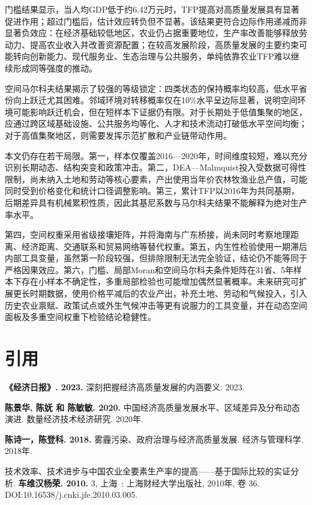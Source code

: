 \documentclass[UTF8,a4paper,12pt,fontset=windows]{ctexart}
\begin{document}
门槛结果显示，当人均GDP低于约6.42万元时，TFP提高对高质量发展具有显著促进作用；超过门槛后，估计效应转负但不显著。该结果更符合边际作用递减而非显著负效应：在经济基础较低地区，农业仍占据重要地位，生产率改善能够释放劳动力、提高农业收入并改善资源配置；在较高发展阶段，高质量发展的主要约束可能转向创新能力、现代服务业、生态治理与公共服务，单纯依靠农业TFP难以继续形成同等强度的推动。

空间马尔科夫结果揭示了较强的等级锁定：四类状态的保持概率均较高，低水平省份向上跃迁尤其困难。邻域环境对转移概率仅在10\%水平呈边际显著，说明空间环境可能影响跃迁机会，但在短样本下证据仍有限。对于长期处于低值集聚的地区，应通过跨区域基础设施、公共服务均等化、人才和技术流动打破低水平空间均衡；对于高值集聚地区，则需要发挥示范扩散和产业链带动作用。

本文仍存在若干局限。第一，样本仅覆盖2016---2020年，时间维度较短，难以充分识别长期动态、结构突变和政策冲击。第二，DEA---Malmquist投入受数据可得性限制，尚未纳入土地和劳动等核心要素，产出使用当年价农林牧渔业总产值，可能同时受到价格变化和统计口径调整影响。第三，累计TFP以2016年为共同基期，后期差异具有机械累积性质，因此其基尼系数与马尔科夫结果不能解释为绝对生产率水平。

第四，空间权重采用省级接壤矩阵，并将海南与广东桥接，尚未同时考察地理距离、经济距离、交通联系和贸易网络等替代权重。第五，内生性检验使用一期滞后内部工具变量，虽然第一阶段较强，但排除限制无法完全验证，结论仍不能等同于严格因果效应。第六，门槛、局部Moran和空间马尔科夫条件矩阵在31省、5年样本下存在小样本不确定性，多重局部检验也可能增加偶然显著概率。未来研究可扩展更长时期数据，使用价格平减后的农业产出，补充土地、劳动和气候投入，引入历史农业禀赋、政策试点或外生气候冲击等更有说服力的工具变量，并在动态空间面板及多重空间权重下检验结论稳健性。

\section{引用}\label{ux5f15ux7528}

\textbf{《经济日报》. 2023.} 深刻把握经济高质量发展的内涵要义. 2023.

\textbf{陈景华, 陈妩 和 陈敏敏. 2020.} 中国经济高质量发展水平、区域差异及分布动态演进. 数量经济技术经济研究. 2020年.

\textbf{陈诗一，陈登科. 2018.} 雾霾污染、政府治理与经济高质量发展. 经济与管理科学. 2018年.

技术效率、技术进步与中国农业全要素生产率的提高------基于国际比较的实证分析. \textbf{车维汉杨荣. 2010.} 3, 上海~: 上海财经大学出版社, 2010年, 卷 36. DOI:10.16538/j.cnki.jfe.2010.03.005.
\end{document}
